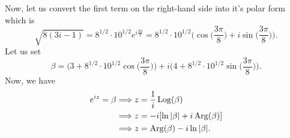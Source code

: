 \documentclass[a4paper]{article}
\begin{document}
\begin{enumerate}
\begin{solution}
        Now, let us convert the first term on the right-hand side into it's polar form which is 
        \[  \sqrt{ 8 (3i - 1) } = 8^{1/2} \cdot 10^{1/2} e^{i \frac{ 3 \pi }{ 8 } } = 8^{1/2} \cdot 10^{1/2} \Big(  \cos \Big(  \frac{ 3 \pi }{ 8 }  \Big) + i \sin \Big(  \frac{ 3 \pi  }{ 8 }  \Big) \Big). \]
        Let us set 
        \[  \beta = \Big(  3 + 8^{1/2}\cdot 10^{1/2} \cos \Big(  \frac{ 3 \pi }{ 8 }  \Big) \Big) + i \Big(  4 + 8^{1/2} \cdot 10^{1/2} \sin \Big(  \frac{ 3 \pi  }{ 8 }  \Big) \Big). \]
        Now, we have
        \begin{align*}
            e^{iz} = \beta &\Longrightarrow z  = \frac{ 1 }{ i }  \operatorname{Log} (\beta )  \\
                           &\Longrightarrow z = -i [\ln | \beta  |  + i \operatorname{Arg}(\beta)] \\  
                           &\Longrightarrow z = \operatorname{Arg}(\beta) - i \ln | \beta |.
        \end{align*}
        \end{solution}
\end{enumerate}
\end{document}
